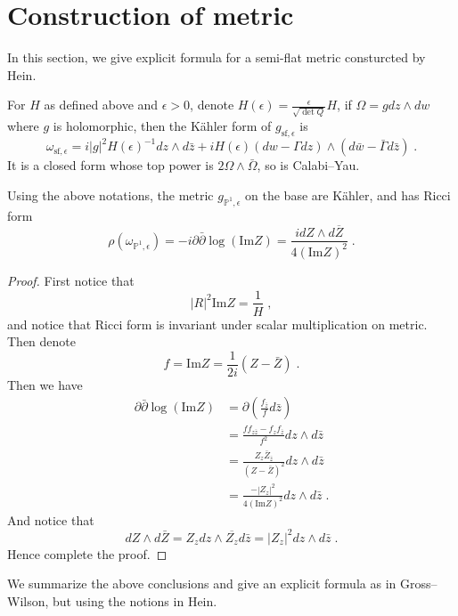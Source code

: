 \section{Construction of metric}
In this section, we give explicit formula for a semi-flat metric consturcted by Hein\cite{hein2012gravitational}.
\begin{lemm}
For $H$ as defined above and $\epsilon>0$, denote $\displaystyle H(\epsilon)=\frac{\epsilon}{\sqrt{\det Q}}H$, if $\Omega=gdz\wedge dw$ where $g$ is holomorphic, then the K{\"a}hler form of $g_{\textrm{sf},\epsilon}$ is
$$\omega_{\textrm{sf},\epsilon}=i|g|^2H(\epsilon)^{-1}dz\wedge d\bar{z}+iH(\epsilon)(dw-\Gamma dz)\wedge(d\bar{w}-\bar{\Gamma}d\bar{z})\; .$$
It is a closed form whose top power is $2\Omega\wedge\bar{\Omega}$, so is Calabi--Yau.
\end{lemm}
\begin{lemm}
Using the above notations, the metric $g_{\mathbb{P}^1,\epsilon}$ on the base are K{\"a}hler, and has Ricci form 
$$\rho(\omega_{\mathbb{P}^1,\epsilon})=-i\partial\bar{\partial}\log(\textrm{Im} Z)=\frac{i dZ\wedge d\overline{Z}}{4(\textrm{Im} Z)^2}\; .$$
\end{lemm}
\begin{proof}
First notice that $$|R|^2\textrm{Im} Z=\frac{1}{H}\; ,$$and notice that Ricci form is invariant under scalar multiplication on metric. Then denote $$f=\textrm{Im} Z=\frac{1}{2i}(Z-\bar{Z})\; .$$
\indent Then we have
\begin{displaymath}
\begin{split}
\partial\bar{\partial}\log(\textrm{Im} Z)&=\partial\left(\frac{f_{\bar{z}}}{f}d\bar{z}\right)\\
&=\frac{ff_{z\bar{z}}-f_z f_{\bar{z}}}{f^2}dz\wedge d\bar{z}\\
&=\frac{Z_z\bar{Z}_{\bar{z}}}{(Z-\bar{Z})^2}dz\wedge d\bar{z}\\
&=\frac{-|Z_z|^2}{4(\textrm{Im} Z)^2}dz\wedge d\bar{z}\; .
\end{split}
\end{displaymath}
\indent And notice that 
$$dZ\wedge d\bar{Z}=Z_zdz\wedge\overline{Z_z}d\bar{z}=|Z_z|^2dz\wedge d\bar{z}\; .$$
\indent Hence complete the proof.
\end{proof}
We summarize the above conclusions and give an explicit formula as in Gross--Wilson\cite{gross2000large}, but using the notions in Hein\cite{hein2012gravitational}.
